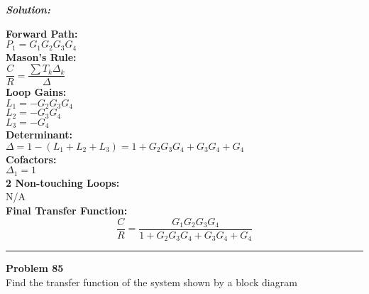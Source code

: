 \documentclass[11pt,letterpaper]{article}
\begin{document}
\vspace{12pt}
\noindent\textit{\textbf{Solution:}}
\begin{center}
\vspace{12pt}


\noindent\textbf{Forward Path:} \\
\hspace*{1em} \( P_1 = G_1G_2G_3G_4 \) \\[6pt]

\noindent\textbf{Mason's Rule:} \\
\hspace*{1em} \( \dfrac{C}{R} = \dfrac{\sum T_k \Delta_k}{\Delta} \) \\[6pt]

\noindent\textbf{Loop Gains:} \\
\hspace*{1em} \( L_1 = -G_2G_3G_4 \) \\
\hspace*{1em} \( L_2 = -G_3G_4 \) \\
\hspace*{1em} \( L_3 = -G_4 \) \\[6pt]

\noindent\textbf{Determinant:} \\
\hspace*{1em} \( \Delta = 1 - (L_1 + L_2 + L_3) = 1 + G_2G_3G_4 + G_3G_4 + G_4 \) \\[6pt]

\noindent\textbf{Cofactors:} \\
\hspace*{1em} \( \Delta_1 = 1 \) \\[6pt]

\noindent\textbf{2 Non-touching Loops:} \\
\hspace*{1em} N/A \\[6pt]

\noindent\textbf{Final Transfer Function:}
\[
\boxed{
\dfrac{C}{R} = \dfrac{G_1G_2G_3G_4}{1 + G_2G_3G_4 + G_3G_4 + G_4}
}
\]
\end{center}

\clearpage
\rule{\textwidth}{1pt}
\textbf{Problem 85}\\
Find the transfer function of the system shown by a block diagram \\
\end{document}
